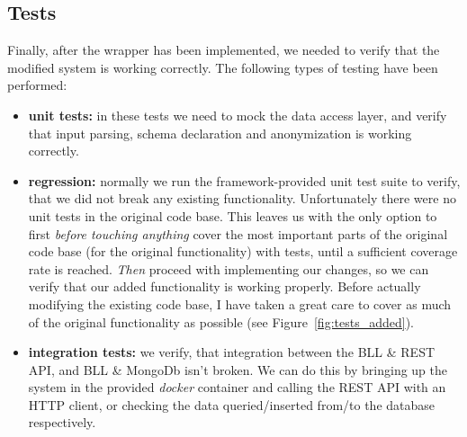 \subsection{Tests}

Finally, after the wrapper has been implemented, we needed to verify that the modified system is working correctly. The following types of testing have been performed:
\begin{itemize}
    \item \textbf{unit tests:} in these tests we need to mock the data access layer, and verify that input parsing, schema declaration and anonymization is working correctly.
    \item \textbf{regression:} normally we run the framework-provided unit test suite to verify, that we did not break any existing functionality. Unfortunately there were no unit tests in the original code base. This leaves us with the only option to first \emph{before touching anything} cover the most important parts of the original code base (for the original functionality) with tests, until a sufficient coverage rate is reached. \emph{Then} proceed with implementing our changes, so we can verify that our added functionality is working properly. Before actually modifying the existing code base, I have taken a great care to cover as much of the original functionality as possible (see Figure~\ref{fig:tests_added}).
    \item \textbf{integration tests:} we verify, that integration between the BLL \& REST API, and BLL \& MongoDb isn't broken. We can do this by bringing up the system in the provided \emph{docker} container and calling the REST API with an HTTP client, or checking the data queried/inserted from/to the database respectively.
\end{itemize}

\vspace{\baselineskip}

